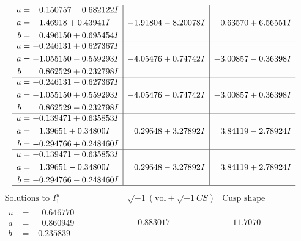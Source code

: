 \documentclass[1p]{elsarticle_modified}
\theoremstyle{definition}
\newcommand{\I}{\sqrt{-1}}
\begin{document}
$$\begin{array}{c|c|c}
\begin{aligned}
u &= -0.150757 - 0.682122 I \\
a &= -1.46918 + 0.43941 I \\
b &= \phantom{-}0.496150 + 0.695454 I\end{aligned}
 & -1.91804 - 8.20078 I & \phantom{-}0.63570 + 6.56551 I \\ \hline\begin{aligned}
u &= -0.246131 + 0.627367 I \\
a &= -1.055150 - 0.559293 I \\
b &= \phantom{-}0.862529 + 0.232798 I\end{aligned}
 & -4.05476 + 0.74742 I & -3.00857 - 0.36398 I \\ \hline\begin{aligned}
u &= -0.246131 - 0.627367 I \\
a &= -1.055150 + 0.559293 I \\
b &= \phantom{-}0.862529 - 0.232798 I\end{aligned}
 & -4.05476 - 0.74742 I & -3.00857 + 0.36398 I \\ \hline\begin{aligned}
u &= -0.139471 + 0.635853 I \\
a &= \phantom{-}1.39651 + 0.34800 I \\
b &= -0.294766 + 0.248460 I\end{aligned}
 & \phantom{-}0.29648 + 3.27892 I & \phantom{-}3.84119 - 2.78924 I \\ \hline\begin{aligned}
u &= -0.139471 - 0.635853 I \\
a &= \phantom{-}1.39651 - 0.34800 I \\
b &= -0.294766 - 0.248460 I\end{aligned}
 & \phantom{-}0.29648 - 3.27892 I & \phantom{-}3.84119 + 2.78924 I\\
 \hline 
 \end{array}$$\newpage$$\begin{array}{c|c|c}  
\text{Solutions to }I^u_{1}& \I (\text{vol} + \sqrt{-1}CS) & \text{Cusp shape}\\
 \hline 
\begin{aligned}
u &= \phantom{-}0.646770\phantom{ +0.000000I} \\
a &= \phantom{-}0.860949\phantom{ +0.000000I} \\
b &= -0.235839\phantom{ +0.000000I}\end{aligned}
 & \phantom{-}0.883017\phantom{ +0.000000I} & \phantom{-}11.7070\phantom{ +0.000000I} \\ \hline\begin{aligned}

\end{aligned}
\end{array}$$
\end{document}
